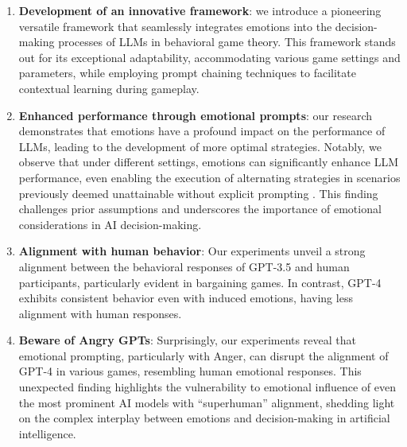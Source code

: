 \documentclass{article}
\begin{document}
\begin{enumerate}
\item \textbf{Development of an innovative framework}: we introduce a pioneering versatile framework that seamlessly integrates emotions into the decision-making processes of LLMs in behavioral game theory. This framework stands out for its exceptional adaptability, accommodating various game settings and parameters, while employing prompt chaining techniques to facilitate contextual learning during gameplay.

\item \textbf{Enhanced performance through emotional prompts}: our research demonstrates that emotions have a profound impact on the performance of LLMs, leading to the development of more optimal strategies. Notably, we observe that under different settings, emotions can significantly enhance LLM performance, even enabling the execution of alternating strategies in scenarios previously deemed unattainable without explicit prompting \cite{akata2023playing}. This finding challenges prior assumptions and underscores the importance of emotional considerations in AI decision-making.

\item \textbf{Alignment with human behavior}: Our experiments unveil a strong alignment between the behavioral responses of GPT-3.5 and human participants, particularly evident in bargaining games. In contrast, GPT-4 exhibits consistent behavior even with induced emotions, having less alignment with human responses.

\item \textbf{Beware of Angry GPTs}: Surprisingly, our experiments reveal that emotional prompting, particularly with Anger, can disrupt the alignment of GPT-4 in various games, resembling human emotional responses. This unexpected finding highlights the vulnerability to emotional influence of even the most prominent AI models with ``superhuman'' alignment, shedding light on the complex interplay between emotions and decision-making in artificial intelligence.
\end{enumerate}






    
\end{document}
